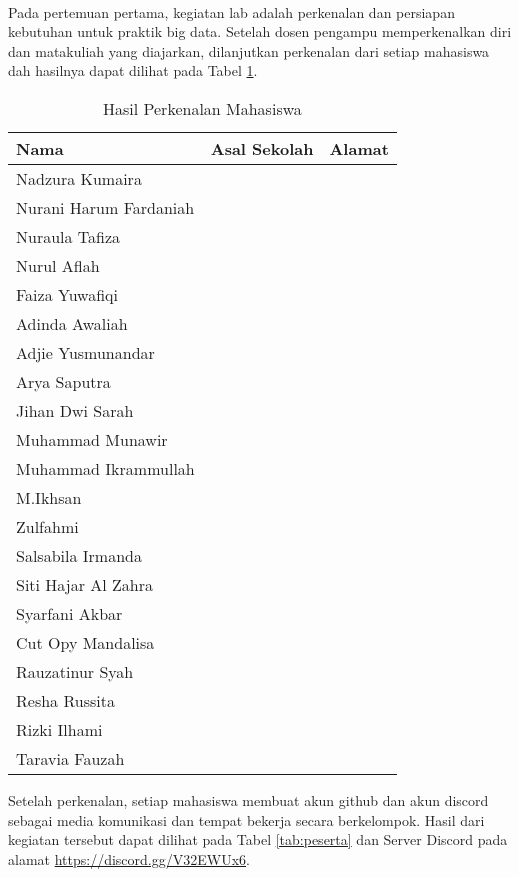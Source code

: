 \documentclass[a4paper]{tufte-handout}
\begin{document}
\newpage
{}

 \\
Pada pertemuan pertama, kegiatan lab adalah perkenalan dan persiapan kebutuhan untuk praktik big data. Setelah dosen pengampu memperkenalkan diri dan matakuliah yang diajarkan, dilanjutkan perkenalan dari setiap mahasiswa dah hasilnya dapat dilihat pada Tabel \ref{tab:perkenalan}.

\begin{table}[!ht]
\caption{Hasil Perkenalan Mahasiswa}
\label{tab:perkenalan}
\centering
\begin{tabular}{llr} 
\toprule
Nama 	&	Asal Sekolah 	&	Alamat\\
\midrule
Nadzura Kumaira			& & \\
Nurani Harum Fardaniah	& & \\
Nuraula Tafiza			& & \\
Nurul Aflah				& & \\
Faiza Yuwafiqi			& & \\
\midrule
Adinda Awaliah			& & \\
Adjie Yusmunandar		& & \\
Arya Saputra			& & \\
Jihan Dwi Sarah			& & \\
\midrule
Muhammad Munawir		& & \\
Muhammad Ikrammullah	& & \\
M.Ikhsan				& & \\
Zulfahmi				& & \\
\midrule
Salsabila Irmanda		& & \\
Siti Hajar Al Zahra		& & \\
Syarfani Akbar			& & \\
Cut Opy Mandalisa		& & \\
\midrule
Rauzatinur Syah			& & \\
Resha Russita			& & \\
Rizki Ilhami			& & \\
Taravia Fauzah			& & \\
\midrule
\end{tabular}
\end{table}

Setelah perkenalan, setiap mahasiswa membuat akun github dan akun discord sebagai media komunikasi dan tempat bekerja secara berkelompok. Hasil dari kegiatan tersebut dapat dilihat pada Tabel \ref{tab:peserta} dan Server Discord pada alamat \url{https://discord.gg/V32EWUx6}.
\end{document}
